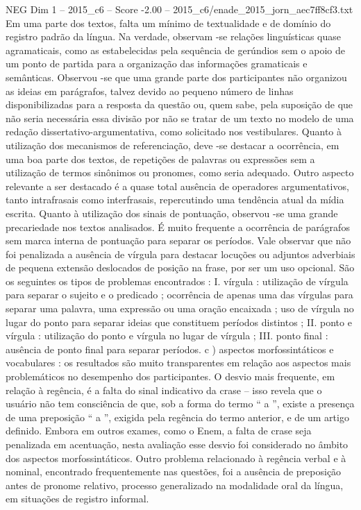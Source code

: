 \begin{textsample}{NEG Dim 1 – 2015\_c6 – Score -2.00 – 2015\_c6/enade\_2015\_jorn\_aec7ff8cf3.txt}
Em uma parte dos textos, falta um mínimo de textualidade e de domínio do registro padrão da língua.
Na verdade, observam -se relações linguísticas quase agramaticais, como as estabelecidas pela sequência de gerúndios sem o apoio de um ponto de partida para a organização das informações gramaticais e semânticas.
Observou -se que uma grande parte dos participantes não organizou as ideias em parágrafos, talvez devido ao pequeno número de linhas disponibilizadas para a resposta da questão ou, quem sabe, pela suposição de que não seria necessária essa divisão por não se tratar de um texto no modelo de uma redação dissertativo-argumentativa, como solicitado nos vestibulares.
Quanto à utilização dos mecanismos de referenciação, deve -se destacar a ocorrência, em uma boa parte dos textos, de repetições de palavras ou expressões sem a utilização de termos sinônimos ou pronomes, como seria adequado.
Outro aspecto relevante a ser destacado é a quase total ausência de operadores argumentativos, tanto intrafrasais como interfrasais, repercutindo uma tendência atual da mídia escrita.
Quanto à utilização dos sinais de pontuação, observou -se uma grande precariedade nos textos analisados.
É muito frequente a ocorrência de parágrafos sem marca interna de pontuação para separar os períodos.
Vale observar que não foi penalizada a ausência de vírgula para destacar locuções ou adjuntos adverbiais de pequena extensão deslocados de posição na frase, por ser um uso opcional.
São os seguintes os tipos de problemas encontrados : I. vírgula : utilização de vírgula para separar o sujeito e o predicado ; ocorrência de apenas uma das vírgulas para separar uma palavra, uma expressão ou uma oração encaixada ; uso de vírgula no lugar do ponto para separar ideias que constituem períodos distintos ; II. ponto e vírgula : utilização do ponto e vírgula no lugar de vírgula ; III. ponto final : ausência de ponto final para separar períodos. c ) aspectos morfossintáticos e vocabulares : os resultados são muito transparentes em relação aos aspectos mais problemáticos no desempenho dos participantes.
O desvio mais frequente, em relação à regência, é a falta do sinal indicativo da crase – isso revela que o usuário não tem consciência de que, sob a forma do termo “ a ”, existe a presença de uma preposição “ a ”, exigida pela regência do termo anterior, e de um artigo definido.
Embora em outros exames, como o Enem, a falta de crase seja penalizada em acentuação, nesta avaliação esse desvio foi considerado no âmbito dos aspectos morfossintáticos.
Outro problema relacionado à regência verbal e à nominal, encontrado frequentemente nas questões, foi a ausência de preposição antes de pronome relativo, processo generalizado na modalidade oral da língua, em situações de registro informal.

\end{textsample}
